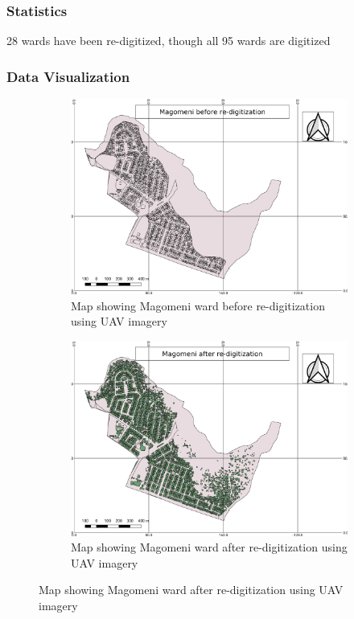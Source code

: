 \documentclass[a4paper,12pt,twoside]{article}
\begin{document}
\subsubsection{Statistics}
28 wards have been re-digitized, though all 95 wards are digitized

\subsubsection{Data Visualization}

\begin{figure}
  \begin{subfigure}[b]{0.5\textwidth}
    \includegraphics[width=\textwidth]{Magomeni_Before_Re-digitization.png}
   \color{RHgreen}\caption{Map showing Magomeni ward before re-digitization using UAV imagery}
    \label{fig:1}
  \end{subfigure}
  \begin{subfigure}[b]{0.5\textwidth}
    \includegraphics[width=\textwidth]{Magomeni_After_Re-digitization.png}
    \color{RHgreen}\caption{Map showing Magomeni ward after re-digitization using UAV imagery}
    \label{fig:2}
  \end{subfigure}
\end{figure}
\end{document}
